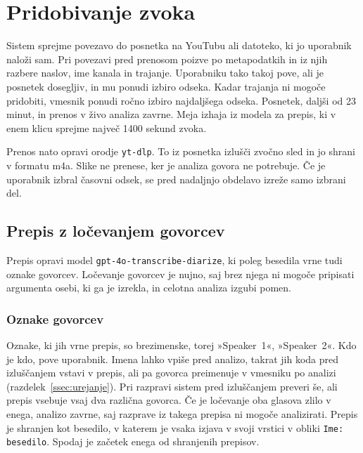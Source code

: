 \documentclass[a4paper, 12pt]{book}
\begin{document}
\section{Pridobivanje zvoka}
\label{sec:prenos}

Sistem sprejme povezavo do posnetka na YouTubu ali datoteko, ki jo uporabnik
naloži sam. Pri povezavi pred prenosom poizve po metapodatkih in iz njih razbere naslov, ime kanala in trajanje. Uporabniku tako takoj pove, ali je posnetek dosegljiv, in mu ponudi izbiro odseka. Kadar trajanja ni mogoče pridobiti, vmesnik ponudi ročno izbiro najdaljšega odseka. Posnetek, daljši od 23 minut, in prenos v živo analiza zavrne. Meja izhaja iz
modela za prepis, ki v enem klicu sprejme največ 1400 sekund zvoka.

Prenos nato opravi orodje \texttt{yt-dlp}. To iz posnetka izlušči zvočno sled in jo shrani v formatu m4a. Slike ne prenese, ker je analiza govora ne potrebuje. Če je uporabnik izbral časovni odsek, se pred nadaljnjo obdelavo izreže samo izbrani del.


\subsection{Prepis z ločevanjem govorcev}
\label{ssec:diarizacija}

Prepis opravi model \texttt{gpt-4o-transcribe-diarize}, ki poleg besedila vrne tudi oznake govorcev. Ločevanje govorcev je nujno, saj brez njega ni mogoče pripisati argumenta osebi, ki ga je izrekla, in celotna analiza izgubi pomen.


\subsubsection{Oznake govorcev}
Oznake, ki jih vrne prepis, so brezimenske, torej »Speaker~1«, »Speaker~2«. Kdo je kdo, pove uporabnik. Imena lahko vpiše pred analizo, takrat jih koda pred izluščanjem vstavi v prepis, ali pa govorca preimenuje v vmesniku po analizi (razdelek~\ref{ssec:urejanje}).
Pri razpravi sistem pred izluščanjem preveri še, ali prepis vsebuje vsaj dva
različna govorca. Če je ločevanje oba glasova zlilo v enega, analizo zavrne, saj
razprave iz takega prepisa ni mogoče analizirati. Prepis je shranjen kot
besedilo, v katerem je vsaka izjava v svoji vrstici v obliki \texttt{Ime:
besedilo}. Spodaj je začetek enega od shranjenih prepisov.
\end{document}
